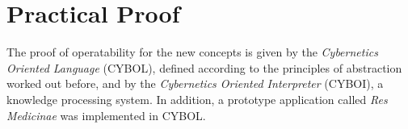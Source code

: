 %
%
%
%
%
%
%

\section{Practical Proof}
\label{practical_proof_heading}

The proof of operatability for the new concepts is given by the
\emph{Cybernetics Oriented Language} (CYBOL), defined according to the
principles of abstraction worked out before, and by the
\emph{Cybernetics Oriented Interpreter} (CYBOI), a knowledge processing system.
In addition, a prototype application called \emph{Res Medicinae}
\cite{resmedicinae} was implemented in CYBOL.




